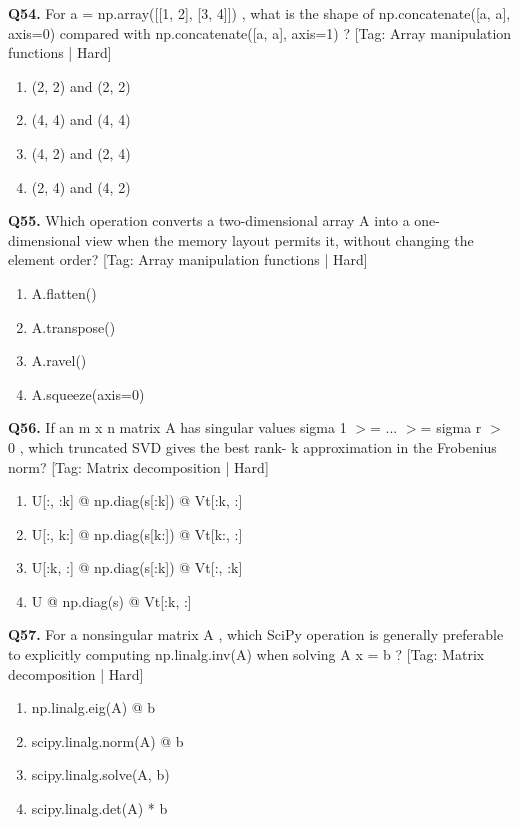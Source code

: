 \vspace{2mm}
\noindent\textbf{Q54.} For a = np.array([[1, 2], [3, 4]]) , what is the shape of np.concatenate([a, a], axis=0) compared with np.concatenate([a, a], axis=1) ? \hfill [Tag: Array manipulation functions | Hard]
\begin{enumerate}[label=(\alph*),topsep=2pt,itemsep=1pt,partopsep=0pt,parsep=0pt]
    \item {(2, 2) and (2, 2)}
    \item {(4, 4) and (4, 4)}
    \item {(4, 2) and (2, 4)}
    \item {(2, 4) and (4, 2)}
\end{enumerate}
\vspace{2mm}
\noindent\textbf{Q55.} Which operation converts a two-dimensional array A into a one-dimensional view when the memory layout permits it, without changing the element order? \hfill [Tag: Array manipulation functions | Hard]
\begin{enumerate}[label=(\alph*),topsep=2pt,itemsep=1pt,partopsep=0pt,parsep=0pt]
    \item {A.flatten()}
    \item {A.transpose()}
    \item {A.ravel()}
    \item {A.squeeze(axis=0)}
\end{enumerate}
\vspace{2mm}
\noindent\textbf{Q56.} If an m x n matrix A has singular values sigma 1 $>$= ... $>$= sigma r $>$ 0 , which truncated SVD gives the best rank- k approximation in the Frobenius norm? \hfill [Tag: Matrix decomposition | Hard]
\begin{enumerate}[label=(\alph*),topsep=2pt,itemsep=1pt,partopsep=0pt,parsep=0pt]
    \item {U[:, :k] @ np.diag(s[:k]) @ Vt[:k, :]}
    \item {U[:, k:] @ np.diag(s[k:]) @ Vt[k:, :]}
    \item {U[:k, :] @ np.diag(s[:k]) @ Vt[:, :k]}
    \item {U @ np.diag(s) @ Vt[:k, :]}
\end{enumerate}
\vspace{2mm}
\noindent\textbf{Q57.} For a nonsingular matrix A , which SciPy operation is generally preferable to explicitly computing np.linalg.inv(A) when solving A x = b ? \hfill [Tag: Matrix decomposition | Hard]
\begin{enumerate}[label=(\alph*),topsep=2pt,itemsep=1pt,partopsep=0pt,parsep=0pt]
    \item {np.linalg.eig(A) @ b}
    \item {scipy.linalg.norm(A) @ b}
    \item {scipy.linalg.solve(A, b)}
    \item {scipy.linalg.det(A) * b}
\end{enumerate}
